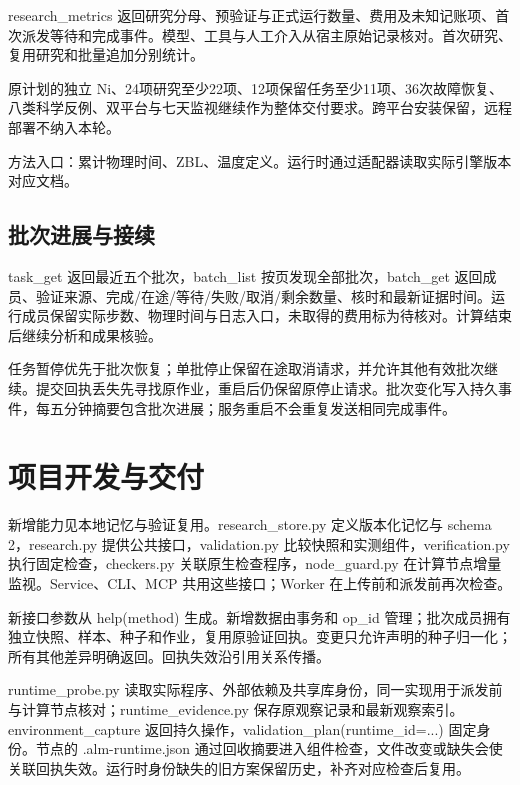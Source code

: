 \documentclass[11pt,a4paper]{ctexart}
\begin{document}
research\_\allowbreak{}metrics 返回研究分母、预验证与正式运行数量、费用及未知记账项、首次派发等待和完成事件。模型、工具与人工介入从宿主原始记录核对。首次研究、复用研究和批量追加分别统计。



原计划的独立 Ni、24项研究至少22项、12项保留任务至少11项、36次故障恢复、八类科学反例、双平台与七天监视继续作为整体交付要求。跨平台安装保留，远程部署不纳入本轮。



方法入口：累计物理时间、ZBL、温度定义。运行时通过适配器读取实际引擎版本对应文档。



\subsection{批次进展与接续}


task\_\allowbreak{}get 返回最近五个批次，batch\_\allowbreak{}list 按页发现全部批次，batch\_\allowbreak{}get 返回成员、验证来源、完成/\allowbreak{}在途/\allowbreak{}等待/\allowbreak{}失败/\allowbreak{}取消/\allowbreak{}剩余数量、核时和最新证据时间。运行成员保留实际步数、物理时间与日志入口，未取得的费用标为待核对。计算结束后继续分析和成果核验。



任务暂停优先于批次恢复；单批停止保留在途取消请求，并允许其他有效批次继续。提交回执丢失先寻找原作业，重启后仍保留原停止请求。批次变化写入持久事件，每五分钟摘要包含批次进展；服务重启不会重复发送相同完成事件。

\clearpage
\section{项目开发与交付}


新增能力见本地记忆与验证复用。research\_\allowbreak{}store.py 定义版本化记忆与 schema 2，research.py 提供公共接口，validation.py 比较快照和实测组件，verification.py 执行固定检查，checkers.py 关联原生检查程序，node\_\allowbreak{}guard.py 在计算节点增量监视。Service、CLI、MCP 共用这些接口；Worker 在上传前和派发前再次检查。



新接口参数从 help(method) 生成。新增数据由事务和 op\_\allowbreak{}id 管理；批次成员拥有独立快照、样本、种子和作业，复用原验证回执。变更只允许声明的种子归一化；所有其他差异明确返回。回执失效沿引用关系传播。



runtime\_\allowbreak{}probe.py 读取实际程序、外部依赖及共享库身份，同一实现用于派发前与计算节点核对；runtime\_\allowbreak{}evidence.py 保存原观察记录和最新观察索引。environment\_\allowbreak{}capture 返回持久操作，validation\_\allowbreak{}plan(runtime\_\allowbreak{}id=...) 固定身份。节点的 .alm-runtime.json 通过回收摘要进入组件检查，文件改变或缺失会使关联回执失效。运行时身份缺失的旧方案保留历史，补齐对应检查后复用。
\end{document}
